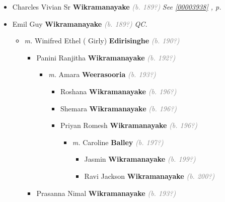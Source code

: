 \documentclass[10pt, openany]{book}
\begin{document}
\begin{itemize}
{\begin{itemize}
{  }
\item{Charcles Vivian Sr \textbf{Wikramanayake} \textcolor{gray}{\textit{(b. 189?)}} \textcolor{slteal}{\textit{See  \autoref{00003938} \textit{, p. \pageref{00003938} }}}}
\item{Emil Guy \textbf{Wikramanayake} \textcolor{gray}{\textit{(b. 189?)}} \textcolor{slmaroon}{\textit{QC.}}
\begin{itemize}
\item{\textit{m.} Winifred Ethel ( Girly) \textbf{Edirisinghe} \textcolor{gray}{\textit{(b. 190?)}}   \label{couple:00003984:00003985} \begin{itemize}
\item{Panini Ranjitha \textbf{Wikramanayake} \textcolor{gray}{\textit{(b. 192?)}}
\begin{itemize}
\item{\textit{m.} Amara \textbf{Weerasooria} \textcolor{gray}{\textit{(b. 193?)}}   \label{couple:00003986:00003987} \begin{itemize}
\item{Roshana \textbf{Wikramanayake} \textcolor{gray}{\textit{(b. 196?)}}
 }
\item{Shemara \textbf{Wikramanayake} \textcolor{gray}{\textit{(b. 196?)}}
 }
\item{Priyan Romesh \textbf{Wikramanayake} \textcolor{gray}{\textit{(b. 196?)}}
\begin{itemize}
\item{\textit{m.} Caroline \textbf{Balley} \textcolor{gray}{\textit{(b. 197?)}}   \label{couple:00003990:00003991} \begin{itemize}
\item{Jasmin \textbf{Wikramanayake} \textcolor{gray}{\textit{(b. 199?)}}
 }
\item{Ravi Jackson \textbf{Wikramanayake} \textcolor{gray}{\textit{(b. 200?)}}
  }
\end{itemize}}
\end{itemize}
  }
\end{itemize}}
\end{itemize}
  }
\item{Prasanna Nimal \textbf{Wikramanayake} \textcolor{gray}{\textit{(b. 193?)}}
  }

\end{itemize}}
\end{itemize}}
\end{itemize}}
\end{itemize}
\end{document}
